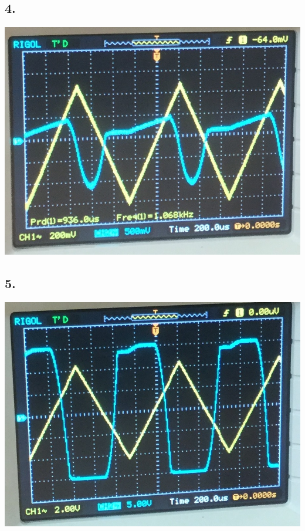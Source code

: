 \documentclass[polish,a4paper]{article}
\begin{document}
\subsection*{4.}
\includegraphics[scale=0.5]{czestotliwosc3}
\subsection*{5.}
\includegraphics[scale=0.5]{lepiej}
\end{document}
